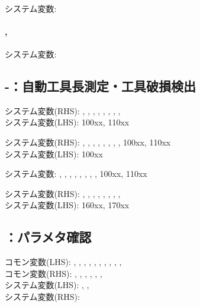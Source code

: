 \paragraph*{}
システム変数: 

\paragraph*{, }
システム変数: 

\subsection{-：自動工具長測定・工具破損検出}
\begin{hosoku}\small
システム変数(RHS): , , , , , , , , \\
システム変数(LHS): \ttNum100xx, \ttNum110xx
\end{hosoku}

\begin{hosoku}\small
システム変数(RHS): , , , , , , , , \ttNum100xx, \ttNum110xx\\
システム変数(LHS): \ttNum100xx
\end{hosoku}

\begin{hosoku}\small
システム変数: , , , , , , , , \ttNum100xx, \ttNum110xx
\end{hosoku}

\begin{hosoku}\small
システム変数(RHS): , , , , , , , , \\
システム変数(LHS): \ttNum160xx, \ttNum170xx
\end{hosoku}

\subsection{：パラメタ確認}
\begin{hosoku}\small
コモン変数(LHS): , , , , , , , , , , \\
コモン変数(RHS): , , , , , , \\
システム変数(LHS): , , \\
システム変数(RHS): 
\end{hosoku}

